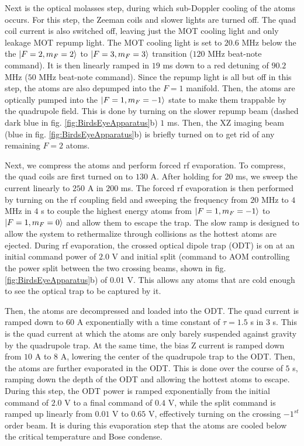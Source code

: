 Next is the optical molasses step, during which sub-Doppler cooling of the atoms occurs. For this step, the Zeeman coils and slower lights are turned off. The quad coil current is also switched off, leaving just the MOT cooling light and only leakage MOT repump light. The MOT cooling light is set to $20.6$ MHz below the the $\mathinner{|{F=2,m_F=2}\rangle}$ to $\mathinner{|{F=3,m_F=3}\rangle}$ transition ($120$ MHz beat-note command). It is then linearly ramped in $19$ ms down to a red detuning of $90.2$ MHz ($50$ MHz beat-note command). Since the repump light is all but off in this step, the atoms are also depumped into the $F=1$ manifold. Then, the atoms are optically pumped into the $\mathinner{|{F=1,m_F=-1}\rangle}$ state to make them trappable by the quadrupole field. This is done by turning on the slower repump beam (dashed dark blue in fig. \ref{fig:BirdsEyeApparatus}b) $1$ ms. Then, the XZ imaging beam (blue in fig. \ref{fig:BirdsEyeApparatus}b) is briefly turned on to get rid of any remaining $F=2$ atoms. 

Next, we compress the atoms and perform forced rf evaporation. To compress, the quad coils are first turned on to $130$ A. After holding for 20 ms, we sweep the current linearly to $250$ A in $200$ ms. The forced rf evaporation is then performed by turning on the rf coupling field and sweeping the frequency from $20$ MHz to $4$ MHz in $4$ s to couple the highest energy atoms from $\mathinner{|{F=1,m_F=-1}\rangle}$ to $\mathinner{|{F=1,m_F=0}\rangle}$ and allow them to escape the trap. The slow ramp is designed to allow the system to rethermalize through collisions as the hottest atoms are ejected.  During rf evaporation, the crossed optical dipole trap (ODT) is on at an initial command power of $2.0$ V and initial split (command to AOM controlling the power split between the two crossing beams, shown in fig. \ref{fig:BirdsEyeApparatus}b) of $0.01$ V. This allows any atoms that are cold enough to see the optical trap  to be captured by it.

Then, the atoms are decompressed and loaded into the ODT. The quad current is ramped down to $60$ A exponentially with a time constant of $\tau=1.5$ s in $3$ s. This is the quad current at which the atoms are only barely suspended against gravity by the quadrupole trap. At the same time, the bias Z current is ramped down from $10$ A to $8$ A, lowering the center of the quadrupole trap to the ODT. Then, the atoms are further evaporated in the ODT. This is done over the course of $5$ s, ramping down the depth of the ODT and allowing the hottest atoms to escape. During this step, the ODT power is ramped exponentially from the initial command of $2.0$ V to a final command of $0.4$ V, while the split command is ramped up linearly from $0.01$ V to $0.65$ V, effectively turning on the crossing $-1^{st}$ order beam. It is during this evaporation step that the atoms are cooled below the critical temperature and Bose condense.

